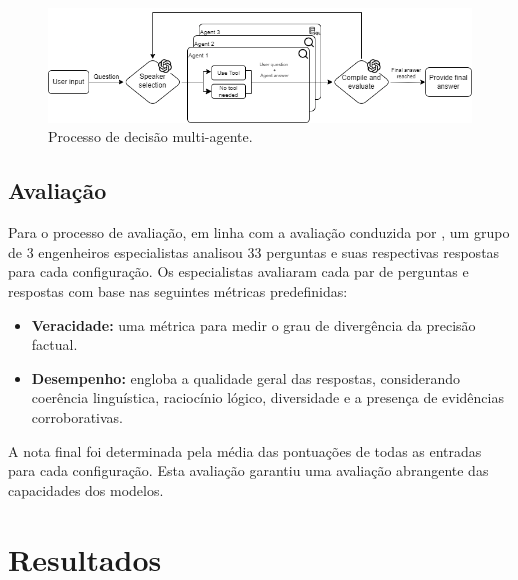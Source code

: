             \begin{figure}[hbt]
                \centering
                \includegraphics[width=1\textwidth]{images/agent_diagram_2.png}
                \caption{Processo de decisão multi-agente.}
                \label{fig:diagrama_agente_MultiAgente_2}
            \end{figure}    

            
        \subsection{Avaliação}             
    
            Para o processo de avaliação, em linha com a avaliação conduzida por \cite{Li2023}, um grupo de 3 engenheiros especialistas analisou 33 perguntas e suas respectivas respostas para cada configuração. Os especialistas avaliaram cada par de perguntas e respostas com base nas seguintes métricas predefinidas:
    
            \begin{itemize}
                
                \item \textbf{Veracidade:} uma métrica para medir o grau de divergência da precisão factual.
                
        
                \item \textbf{Desempenho:} engloba a qualidade geral das respostas, considerando coerência linguística, raciocínio lógico, diversidade e a presença de evidências corroborativas.
                
            \end{itemize}
            
            A nota final foi determinada pela média das pontuações de todas as entradas para cada configuração. Esta avaliação garantiu uma avaliação abrangente das capacidades dos modelos.
    
    
    \section{Resultados}
    
